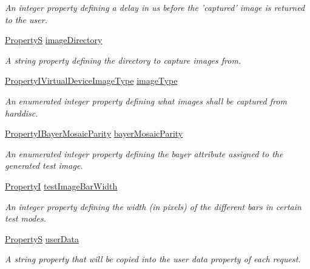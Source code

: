 \begin{DoxyCompactItemize}
\begin{DoxyCompactList}\small\item\em An integer property defining a delay in us before the 'captured' image is returned to the user. \end{DoxyCompactList}\item 
\hyperlink{classmv_i_m_p_a_c_t_1_1acquire_1_1_property_s}{Property\+S} \hyperlink{classmv_i_m_p_a_c_t_1_1acquire_1_1_camera_settings_virtual_device_a399ecae9be05ea1c5bc3f73565fb7ea5}{image\+Directory}
\begin{DoxyCompactList}\small\item\em A string property defining the directory to capture images from. \end{DoxyCompactList}\item 
\hyperlink{group___device_specific_interface_gacfecce2b643c06f4a31fbced42789247}{Property\+I\+Virtual\+Device\+Image\+Type} \hyperlink{classmv_i_m_p_a_c_t_1_1acquire_1_1_camera_settings_virtual_device_aa2e7f03546b993681065cf0e5ff870dc}{image\+Type}
\begin{DoxyCompactList}\small\item\em An enumerated integer property defining what images shall be captured from harddisc. \end{DoxyCompactList}\item 
\hyperlink{group___common_interface_gafaa3668c30761b139d7ff110ac2c83e4}{Property\+I\+Bayer\+Mosaic\+Parity} \hyperlink{classmv_i_m_p_a_c_t_1_1acquire_1_1_camera_settings_virtual_device_a869a0aa796304b7c181fce9ff7a6abec}{bayer\+Mosaic\+Parity}
\begin{DoxyCompactList}\small\item\em An enumerated integer property defining the bayer attribute assigned to the generated test image. \end{DoxyCompactList}\item 
\hypertarget{classmv_i_m_p_a_c_t_1_1acquire_1_1_camera_settings_virtual_device_a874e311390efb6d1399422843a0a6f01}{\hyperlink{group___common_interface_ga12d5e434238ca242a1ba4c6c3ea45780}{Property\+I} \hyperlink{classmv_i_m_p_a_c_t_1_1acquire_1_1_camera_settings_virtual_device_a874e311390efb6d1399422843a0a6f01}{test\+Image\+Bar\+Width}}\label{classmv_i_m_p_a_c_t_1_1acquire_1_1_camera_settings_virtual_device_a874e311390efb6d1399422843a0a6f01}

\begin{DoxyCompactList}\small\item\em An integer property defining the width (in pixels) of the different bars in certain test modes. \end{DoxyCompactList}\item 
\hyperlink{classmv_i_m_p_a_c_t_1_1acquire_1_1_property_s}{Property\+S} \hyperlink{classmv_i_m_p_a_c_t_1_1acquire_1_1_camera_settings_virtual_device_abb3e253cf1ce3d67b534362fd93856ec}{user\+Data}
\begin{DoxyCompactList}\small\item\em A string property that will be copied into the user data property of each request. \end{DoxyCompactList}\end{DoxyCompactItemize}

